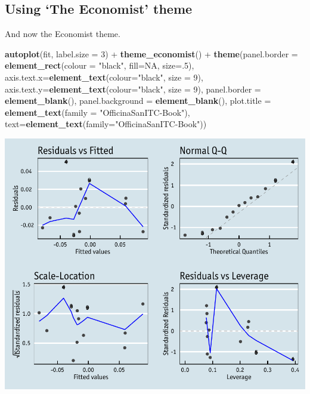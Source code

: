 \documentclass[]{article}
\newenvironment{Shaded}{\begin{snugshade}}{\end{snugshade}}
\newcommand{\KeywordTok}[1]{\textcolor[rgb]{0.13,0.29,0.53}{\textbf{{#1}}}}
\newcommand{\DataTypeTok}[1]{\textcolor[rgb]{0.13,0.29,0.53}{{#1}}}
\newcommand{\DecValTok}[1]{\textcolor[rgb]{0.00,0.00,0.81}{{#1}}}
\newcommand{\StringTok}[1]{\textcolor[rgb]{0.31,0.60,0.02}{{#1}}}
\newcommand{\OtherTok}[1]{\textcolor[rgb]{0.56,0.35,0.01}{{#1}}}
\newcommand{\NormalTok}[1]{{#1}}
\begin{document}
\subsection{\texorpdfstring{Using `The Economist'
theme}{Using The Economist theme}}\label{using-the-economist-theme-1}

And now the Economist theme.

\begin{Shaded}
\begin{Highlighting}[]
\KeywordTok{autoplot}\NormalTok{(fit, }\DataTypeTok{label.size =} \DecValTok{3}\NormalTok{) +}\StringTok{ }\KeywordTok{theme_economist}\NormalTok{() +}
\StringTok{  }\KeywordTok{theme}\NormalTok{(}\DataTypeTok{panel.border =} \KeywordTok{element_rect}\NormalTok{(}\DataTypeTok{colour =} \StringTok{"black"}\NormalTok{, }\DataTypeTok{fill=}\OtherTok{NA}\NormalTok{, }\DataTypeTok{size=}\NormalTok{.}\DecValTok{5}\NormalTok{),}
    \DataTypeTok{axis.text.x=}\KeywordTok{element_text}\NormalTok{(}\DataTypeTok{colour=}\StringTok{"black"}\NormalTok{, }\DataTypeTok{size =} \DecValTok{9}\NormalTok{), }
    \DataTypeTok{axis.text.y=}\KeywordTok{element_text}\NormalTok{(}\DataTypeTok{colour=}\StringTok{"black"}\NormalTok{, }\DataTypeTok{size =} \DecValTok{9}\NormalTok{),}
    \DataTypeTok{panel.border =} \KeywordTok{element_blank}\NormalTok{(), }\DataTypeTok{panel.background =} \KeywordTok{element_blank}\NormalTok{(),}
    \DataTypeTok{plot.title =} \KeywordTok{element_text}\NormalTok{(}\DataTypeTok{family =} \StringTok{"OfficinaSanITC-Book"}\NormalTok{),}
    \DataTypeTok{text=}\KeywordTok{element_text}\NormalTok{(}\DataTypeTok{family=}\StringTok{"OfficinaSanITC-Book"}\NormalTok{))}
\end{Highlighting}
\end{Shaded}

\begin{center}\includegraphics{11_Linear_Regression_Plot_pdf/lr_22-1} \end{center}
\end{document}
